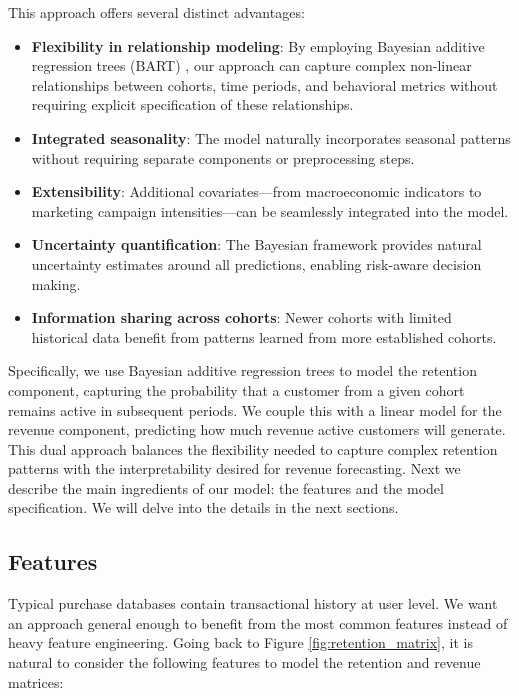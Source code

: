\documentclass[11pt]{amsart}
\theoremstyle{definition}
\begin{document}
This approach offers several distinct advantages:

\begin{itemize}
    \item \textbf{Flexibility in relationship modeling}: By employing Bayesian additive regression trees (BART)
          \cite{quiroga2022bart}, our approach can capture complex non-linear relationships between cohorts, time periods,
          and behavioral metrics without requiring explicit specification of these relationships.

    \item \textbf{Integrated seasonality}: The model naturally incorporates seasonal patterns without requiring separate
          components or preprocessing steps.

    \item \textbf{Extensibility}: Additional covariates—from macroeconomic indicators to marketing campaign intensities—can
          be seamlessly integrated into the model.

    \item \textbf{Uncertainty quantification}: The Bayesian framework provides natural uncertainty estimates around all
          predictions, enabling risk-aware decision making.

    \item \textbf{Information sharing across cohorts}: Newer cohorts with limited historical data benefit from patterns
          learned from more established cohorts.
\end{itemize}

Specifically, we use Bayesian additive regression trees to model the retention component, capturing the probability that a
customer from a given cohort remains active in subsequent periods. We couple this with a linear model for the revenue
component, predicting how much revenue active customers will generate. This dual approach balances the flexibility needed to
capture complex retention patterns with the interpretability desired for revenue forecasting. Next we describe the main
ingredients of our model: the features and the model specification. We will delve into the details in the next sections.

\subsection*{Features}

Typical purchase databases contain transactional history at user level. We want an approach general enough to benefit
from the most common features instead of heavy feature engineering. Going back to Figure \ref{fig:retention_matrix}, it
is natural to consider the following features to model the retention and revenue matrices:
\end{document}
